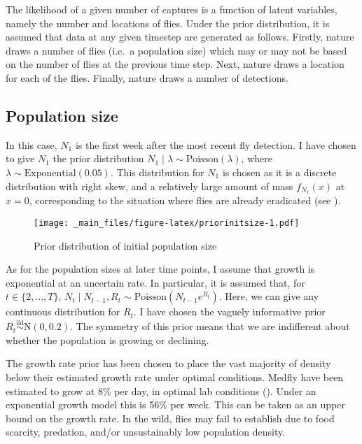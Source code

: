 \documentclass[
  oneside]{book}
\begin{document}
The likelihood of a given number of captures is a function of latent variables, namely the number and locations of flies. Under the prior distribution, it is assumed that data at any given timestep are generated as follows. Firstly, nature draws a number of flies (i.e.~a population size) which may or may not be based on the number of flies at the previous time step. Next, nature draws a location for each of the flies. Finally, nature draws a number of detections.

\hypertarget{population-size-1}{%
\subsection{Population size}\label{population-size-1}}

In this case, \(N_1\) is the first week after the most recent fly detection. I have chosen to give \(N_1\) the prior distribution \(N_1 \mid \lambda \sim \mathrm{Poisson}(\lambda)\), where \(\lambda \sim \mathrm{Exponential}(0.05)\). This distribution for \(N_1\) is chosen as it is a discrete distribution with right skew, and a relatively large amount of mass \(f_{N_1}(x)\) at \(x = 0\), corresponding to the situation where flies are already eradicated (see \citet{priorinitsize}).

\begin{figure}
\centering
\texttt{[image: \_main\_files/figure-latex/priorinitsize-1.pdf]}
\caption{\label{fig:priorinitsize}Prior distribution of initial population size}
\end{figure}

As for the population sizes at later time points, I assume that growth is exponential at an uncertain rate. In particular, it is assumed that, for \(t \in \{2, \ldots, T\}\), \(N_t \mid N_{t-1}, R_t \sim \mathrm{Poisson}(N_{t-1} e^{R_t})\). Here, we can give any continuous distribution for \(R_t\). I have chosen the vaguely informative prior \(R_t \stackrel{\text{iid}} \sim \mathrm N(0, 0.2)\). The symmetry of this prior means that we are indifferent about whether the population is growing or declining.

The growth rate prior has been chosen to place the vast majority of density below their estimated growth rate under optimal conditions. Medfly have been estimated to grow at 8\% per day, in optimal lab conditions (\citet{papadopoulos2002}). Under an exponential growth model this is 56\% per week. This can be taken as an upper bound on the growth rate. In the wild, flies may fail to establish due to food scarcity, predation, and/or unsustainably low population density.
\end{document}
